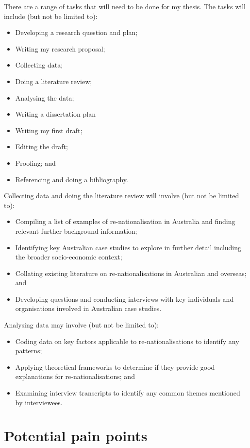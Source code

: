 \documentclass[a4paper]{article}
\begin{document}
There are a range of tasks that will need to be done for my thesis. The tasks will include (but not be limited to):
\begin{itemize}
\item Developing a research question and plan;
\item Writing my research proposal;
\item Collecting data;
\item Doing a literature review;
\item Analysing the data;
\item Writing a dissertation plan
\item Writing my first draft;
\item Editing the draft;
\item Proofing; and
\item Referencing and doing a bibliography.
\end{itemize}
Collecting data and doing the literature review will involve (but not be limited to):
\begin{itemize}
    \item Compiling a list of examples of re-nationalisation in Australia and finding relevant further background information;
    \item Identifying key Australian case studies to explore in further detail including the broader socio-economic context;
    \item Collating existing literature on re-nationalisations in Australian and overseas; and
    \item Developing questions and conducting interviews with key individuals and organisations involved in Australian case studies.
\end{itemize}
Analysing data may involve (but not be limited to):
\begin{itemize}
    \item Coding data on key factors applicable to re-nationalisations to identify any patterns;
	\item Applying theoretical frameworks to determine if they provide good explanations for re-nationalisations; and
\item Examining interview transcripts to identify any common themes mentioned by interviewees.
\end{itemize}

\section*{Potential pain points}
\end{document}
